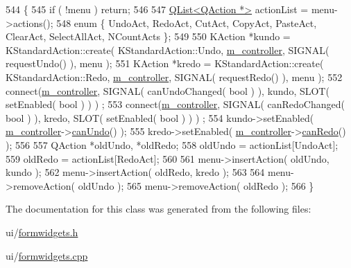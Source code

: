 \begin{DoxyCode}
544 \{
545     \textcolor{keywordflow}{if} ( !menu ) \textcolor{keywordflow}{return};
546 
547     \hyperlink{classQList}{QList<QAction *>} actionList = menu->actions();
548     \textcolor{keyword}{enum} \{ UndoAct, RedoAct, CutAct, CopyAct, PasteAct, ClearAct, SelectAllAct, NCountActs \};
549 
550     KAction *kundo = KStandardAction::create( KStandardAction::Undo, 
      \hyperlink{classFormWidgetIface_a2d51d0c5aaf48aad5480551f69f82e9a}{m\_controller}, SIGNAL( requestUndo() ), menu );
551     KAction *kredo = KStandardAction::create( KStandardAction::Redo, 
      \hyperlink{classFormWidgetIface_a2d51d0c5aaf48aad5480551f69f82e9a}{m\_controller}, SIGNAL( requestRedo() ), menu );
552     connect(\hyperlink{classFormWidgetIface_a2d51d0c5aaf48aad5480551f69f82e9a}{m\_controller}, SIGNAL( canUndoChanged( \textcolor{keywordtype}{bool} ) ), kundo, SLOT( setEnabled( \textcolor{keywordtype}{bool} ) ) )
      ;
553     connect(\hyperlink{classFormWidgetIface_a2d51d0c5aaf48aad5480551f69f82e9a}{m\_controller}, SIGNAL( canRedoChanged( \textcolor{keywordtype}{bool} ) ), kredo, SLOT( setEnabled( \textcolor{keywordtype}{bool} ) ) )
      ;
554     kundo->setEnabled( \hyperlink{classFormWidgetIface_a2d51d0c5aaf48aad5480551f69f82e9a}{m\_controller}->\hyperlink{classFormWidgetsController_a2711f4f025e96e95fe55c162ca321de5}{canUndo}() );
555     kredo->setEnabled( \hyperlink{classFormWidgetIface_a2d51d0c5aaf48aad5480551f69f82e9a}{m\_controller}->\hyperlink{classFormWidgetsController_a960c176392a58a63f271b6c561216b74}{canRedo}() );
556 
557     QAction *oldUndo, *oldRedo;
558     oldUndo = actionList[UndoAct];
559     oldRedo = actionList[RedoAct];
560 
561     menu->insertAction( oldUndo, kundo );
562     menu->insertAction( oldRedo, kredo );
563 
564     menu->removeAction( oldUndo );
565     menu->removeAction( oldRedo );
566 \}
\end{DoxyCode}


The documentation for this class was generated from the following files\+:\begin{DoxyCompactItemize}
\item 
ui/\hyperlink{formwidgets_8h}{formwidgets.\+h}\item 
ui/\hyperlink{formwidgets_8cpp}{formwidgets.\+cpp}\end{DoxyCompactItemize}
